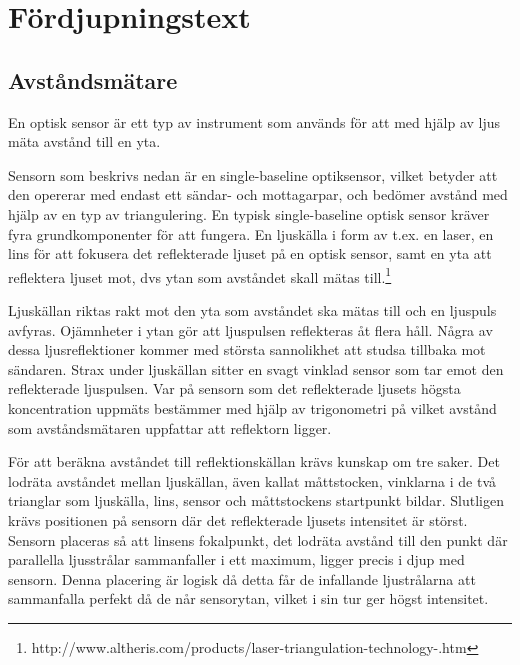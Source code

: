 \documentclass[a4paper,12pt,fleqn]{article}
\begin{document}
\section{Fördjupningstext}
\subsection{Avståndsmätare}
En optisk sensor är ett typ av instrument som används för att med hjälp av ljus mäta avstånd till en yta.

Sensorn som beskrivs nedan är en single-baseline optiksensor, vilket betyder att den opererar med endast ett sändar- och mottagarpar, och bedömer avstånd med hjälp av en typ av triangulering.
En typisk single-baseline optisk sensor kräver fyra grundkomponenter för att fungera.
En ljuskälla i form av t.ex. en laser, en lins för att fokusera det reflekterade ljuset på 
en optisk sensor, samt en yta att reflektera ljuset mot, dvs ytan som avståndet skall mätas till.\footnote{http://www.altheris.com/products/laser-triangulation-technology-.htm}

Ljuskällan riktas rakt mot den yta som avståndet ska mätas till och en ljuspuls avfyras. Ojämnheter i ytan gör att ljuspulsen reflekteras åt flera håll. Några av dessa ljusreflektioner kommer med största sannolikhet att studsa tillbaka mot sändaren.
Strax under ljuskällan sitter en svagt vinklad sensor som tar emot den reflekterade ljuspulsen.  Var på sensorn som det reflekterade ljusets högsta koncentration uppmäts bestämmer med hjälp av trigonometri på vilket avstånd som avståndsmätaren uppfattar att reflektorn ligger.


För att beräkna avståndet till reflektionskällan krävs kunskap om tre saker.
Det lodräta avståndet mellan ljuskällan, även kallat måttstocken, vinklarna i de två trianglar som ljuskälla, lins, sensor och måttstockens startpunkt bildar. Slutligen krävs positionen på sensorn där det reflekterade ljusets intensitet är störst. Sensorn placeras så att linsens fokalpunkt, det lodräta avstånd till den punkt där parallella ljusstrålar sammanfaller i ett maximum, ligger precis i djup med sensorn. Denna placering är logisk då detta får de infallande ljustrålarna att sammanfalla perfekt då de når sensorytan, vilket i sin tur ger högst intensitet.
\end{document}
